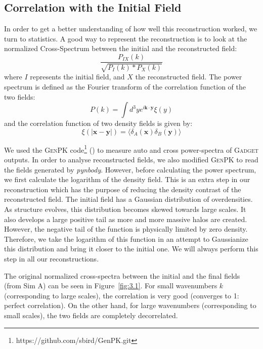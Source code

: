 \subsection{Correlation with the Initial Field}

In order to get a better understanding of how well this reconstruction worked, we turn to statistics. A good way to represent the reconstruction is to look at the normalized Cross-Spectrum between the initial and the reconstructed field: $$ \frac{P_{IX}(k)}{\sqrt{P_I(k) * P_X(k)}} $$ where $I$ represents the initial field, and $X$ the reconstructed field. The power spectrum is defined as the Fourier transform of the correlation function of the two fields:
\begin{equation}
    P(k) = \int{d^3y e^{i\textbf{k} \cdot \textbf{y}} \xi(y)}
\end{equation} 
and the correlation function of two density fields is given by:
\begin{equation}
    \xi(|\textbf{x}-\textbf{y}|) = \langle \delta_A(\textbf{x})\delta_B(\textbf{y}) \rangle
\end{equation}

We used the \textsc{GenPK} code\footnote{https://github.com/sbird/GenPK.git} (\cite{2017ascl.soft06006B}) to measure auto and cross power-spectra of \textsc{Gadget} outputs. In order to analyse reconstructed fields, we also modified \textsc{GenPK} to read the fields generated by \textit{pynbody}. However, before calculating the power spectrum, we first calculate the logarithm of the density field. This is an extra step in our reconstruction which has the purpose of reducing the density contrast of the reconstructed field. The initial field has a Gaussian distribution of overdensities. As structure evolves, this distribution becomes skewed towards large scales. It also develops a large positive tail as more and more massive halos are created. However, the negative tail of the function is physically limited by zero density. Therefore, we take the logarithm of this function in an attempt to Gaussianize this distribution and bring it closer to the initial one. We will always perform this step in all our reconstructions.

The original normalized cross-spectra between the initial and the final fields (from Sim A) can be seen in Figure~\ref{fig:3.1}. For small wavenumbers $k$ (corresponding to large scales), the correlation is very good (converges to 1: perfect correlation). On the other hand, for large wavenumbers (corresponding to small scales), the two fields are completely decorrelated. 

